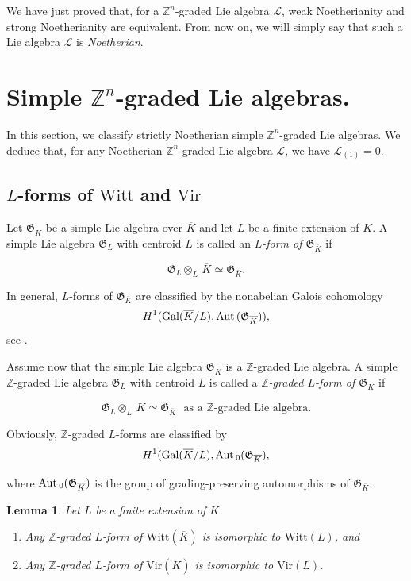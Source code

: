 \documentclass[11pt, letterpaper, reqno]{amsart}
\newtheorem{lemma}[theorem]{Lemma}
\theoremstyle{definition}
\newcommand{\Z}{{\mathbb Z}}
\newcommand{\cL}{\mathcal L}
\newcommand{\Aut}{\mbox{\rm Aut\,}}
\newcommand{\G}{\mathfrak G}
\newcommand{\fG}{\mathfrak{G}}
\newcommand{\Gal}{{\mathrm {Gal}}}
\newcommand{\Vir}{\mathrm{Vir}}
\newcommand{\Witt}{\mathrm{Witt}}
\begin{document}
We have just proved that, for a $\Z^n$-graded Lie algebra $\cL$,
weak Noetherianity and strong Noetherianity are equivalent. From now  on, we will simply say that 
such a Lie algebra $\cL$ is {\it Noetherian}.

\section{Simple $\Z^n$-graded Lie algebras.}\label{classification}


In this section, we classify
strictly Noetherian simple $\Z^n$-graded Lie algebras.
We deduce that, for any Noetherian 
$\Z^n$-graded Lie algebra $\cL$, we
have $\cL_{(1)}=0$.

\subsection{$L$-forms of $\Witt$ and $\Vir$}

Let $\fG_{\overline{K}}$ be a simple Lie algebra
over $\overline{K}$ and let $L$ be a finite extension of $K$.  A simple Lie algebra
$\fG_L$ with centroid $L$ is called an {\it $L$-form of 
$\fG_{\overline{K}}$} if

$$\G_L\otimes_{L}\,{\overline{K}}\simeq \fG_{\overline{K}}.$$ 

\noindent In general, $L$-forms of $\fG_{\overline{K}}$ are classified by the nonabelian Galois cohomology
$$H^1(\Gal(\overline{K}/L), \Aut(\fG_{\overline{K}})),$$
\noindent see \cite{Serre}.

Assume now that the simple Lie algebra $\fG_{\overline{K}}$ is a 
$\Z$-graded Lie algebra. A simple 
$\Z$-graded Lie algebra
$\G_L$ with centroid $L$ is called a {\it $\Z$-graded $L$-form of $\fG_{\overline{K}}$} if

$$\G_L\otimes_{L}\,{\overline{K}}\simeq \fG_{\overline{K}}
\,\,\text{ as a $\Z$-graded Lie algebra}.$$ 


Obviously,  $\Z$-graded $L$-forms are classified by 
$$H^1(\Gal(\overline{K}/L), \Aut_0(\fG_{\overline{K}}),$$ 

\noindent where
$\Aut_0(\fG_{\overline{K}})$ is the group of
grading-preserving automorphisms of $\fG_{\overline{K}}$.

\begin{lemma}\label{form} Let $L$ be a finite 
extension of $K$.
\begin{enumerate}
\item[(a)] Any $\Z$-graded $L$-form of $\Witt(\overline{K})$ is isomorphic to $\Witt(L)$, and
\item[(b)] Any $\Z$-graded $L$-form of $\Vir(\overline{K})$ is isomorphic to $\Vir(L)$.
\end{enumerate}
\end{lemma}
\end{document}
